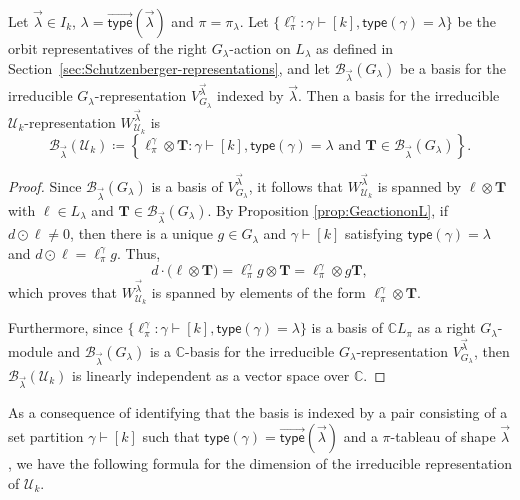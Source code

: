 \documentclass[ALCO,Unicode]{cedram}
\newcommand{\CC}{\mathbb C}
\newcommand{\vtype}{\overrightarrow{\mathsf{type}}}
\begin{document}
\begin{prop} \label{prop:irrepbasis}
Let $\vec{\lambda} \in I_k$, $\lambda = \vtype(\vec{\lambda})$ and $\pi = \pi_\lambda$.
Let
$\{\ell_\pi^\gamma : \gamma \vdash [k], \mathsf{type}(\gamma) = \lambda\}$
be the orbit representatives of the right $G_\lambda$-action on $L_\lambda$ as defined in
Section~\ref{sec:Schutzenberger-representations},
and let $\mathcal{B}_{\vec{\lambda}}(G_\lambda)$ be a basis for the irreducible
$G_\lambda$-representation $V_{G_\lambda}^{\vec{\lambda}}$ indexed by $\vec{\lambda}$.
Then a basis for the irreducible $\mathcal{U}_k$-representation $W_{\mathcal{U}_k}^{\vec{\lambda}}$ is
\[
    \mathcal{B}_{\vec{\lambda}}(\mathcal{U}_k) \coloneqq \left\{ \ell_\pi^\gamma \otimes \mathbf{T} : \gamma \vdash [k], \mathsf{type}(\gamma) = \lambda \text{ and }
    \mathbf{T} \in \mathcal{B}_{\vec{\lambda}}(G_\lambda) \right\}.
\]
\end{prop}

\begin{proof}
    Since $\mathcal{B}_{\vec{\lambda}}(G_\lambda)$ is a basis of $V_{G_\lambda}^{\vec{\lambda}}$,
    it follows that $W_{\mathcal{U}_k}^{\vec{\lambda}}$ is spanned by $\ell \otimes \mathbf{T}$
    with $\ell \in L_\lambda$ and $\mathbf{T} \in \mathcal{B}_{\vec{\lambda}}(G_{\lambda})$.
    By Proposition \ref{prop:GeactiononL}, if $d\odot \ell\neq 0$, then there is a
    unique $g \in G_{\lambda}$ and $\gamma \vdash [k]$ satisfying $\mathsf{type}(\gamma) = \lambda$ and
    $d\odot \ell = \ell_\pi^\gamma g$. Thus,
    \begin{equation*}
        d \cdot \big(\ell \otimes \mathbf{T}\big)
        = \ell_\pi^{\gamma} g \otimes \mathbf{T}
        = \ell_\pi^{\gamma} \otimes g \mathbf{T},
    \end{equation*}
    which proves that $W_{\mathcal{U}_k}^{\vec{\lambda}}$ is spanned by elements of the form $\ell_\pi^\gamma \otimes \mathbf{T}$.

Furthermore, since $\{\ell_\pi^\gamma : \gamma \vdash [k], \mathsf{type}(\gamma) = \lambda\}$
is a basis of $\mathbb{C}L_\pi$ as a right $G_\lambda$-module
and $\mathcal{B}_{\vec{\lambda}}(G_\lambda)$ is a $\CC$-basis
for the irreducible $G_\lambda$-representation $V^{\vec{\lambda}}_{G_\lambda}$, then
$\mathcal{B}_{\vec{\lambda}}(\mathcal{U}_k)$ is linearly independent
as a vector space over $\mathbb{C}$.
\end{proof}

As a consequence of identifying that the basis is indexed by a pair
consisting of a set partition $\gamma \vdash [k]$ such that
$\mathsf{type}(\gamma) = \vtype(\vec{\lambda})$ and a $\pi$-tableau of
shape $\vec{\lambda}$, we have the following formula for the dimension of
the irreducible representation of $\mathcal{U}_k$.
\end{document}
